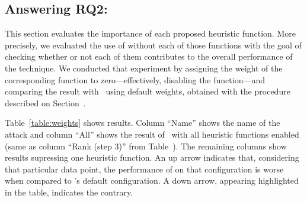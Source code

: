 \documentclass[sigconf,review, anonymous]{acmart}
\begin{document}
\subsection{Answering RQ2: \textRQtwo}
\label{sec:answer-rqtwo}

This section evaluates the importance of each proposed heuristic
function. More precisely, we evaluated the use of \tname{} without
each of those functions with the goal of checking whether or not each
of them contributes to the overall performance of the technique. We
conducted that experiment by assigning the weight of the corresponding
function to zero---effectively, disabling the function---and comparing
the result with \tname\ using default weights, obtained with the
procedure described on Section~.


Table~\ref{table:weights} shows results. Column ``Name'' shows the
name of the attack and column ``All'' shows the result of \tname\ with
all heuristic functions enabled (same as column ``Rank (step 3)'' from
Table~). The remaining columns show results supressing one
heuristic function. An up arrow indicates that, considering that
particular data point, the performance of \tname{} on that
configuration is worse when compared to \tname's default
configuration. A down arrow, appearing highlighted in the table,
indicates the contrary.
\end{document}

